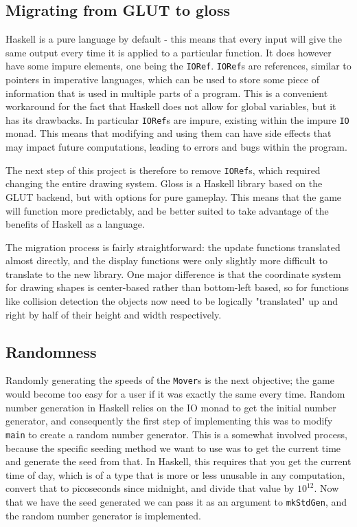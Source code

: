\documentclass[12pt, a4paper]{report}
\begin{document}
\subsection{Migrating from GLUT to gloss}

Haskell is a pure language by default - this means that every input will give the same output every time it is applied to a particular function.
It does however have some impure elements, one being the \verb|IORef|.
\verb|IORef|s are references, similar to pointers in imperative languages, which can be used to store some piece of information that is used in multiple parts of a program\cite{iorefs}.
This is a convenient workaround for the fact that Haskell does not allow for global variables, but it has its drawbacks.
In particular \verb|IORef|s are impure, existing within the impure \verb|IO| monad.
This means that modifying and using them can have side effects that may impact future computations, leading to errors and bugs within the program.

\par

The next step of this project is therefore to remove \verb|IORef|s, which required changing the entire drawing system.
Gloss is a Haskell library based on the GLUT backend, but with options for pure gameplay.
This means that the game will function more predictably, and be better suited to take advantage of the benefits of Haskell as a language.

\par

The migration process is fairly straightforward: the update functions translated almost directly, and the display functions were only slightly more difficult to translate to the new library.
One major difference is that the coordinate system for drawing shapes is center-based rather than bottom-left based, so for functions like collision detection the objects now need to be logically "translated" up and right by half of their height and width respectively.

\subsection{Randomness}

Randomly generating the speeds of the \verb|Mover|s is the next objective; the game would become too easy for a user if it was exactly the same every time.
Random number generation in Haskell relies on the IO monad to get the initial number generator, and consequently the first step of implementing this was to modify \verb|main| to create a random number generator.
This is a somewhat involved process, because the specific seeding method we want to use was to get the current time and generate the seed from that.
In Haskell, this requires that you get the current time of day, which is of a type that is more or less unusable in any computation, convert that to picoseconds since midnight, and divide that value by $10^{12}$.
Now that we have the seed generated we can pass it as an argument to \verb|mkStdGen|, and the random number generator is implemented.
\end{document}

